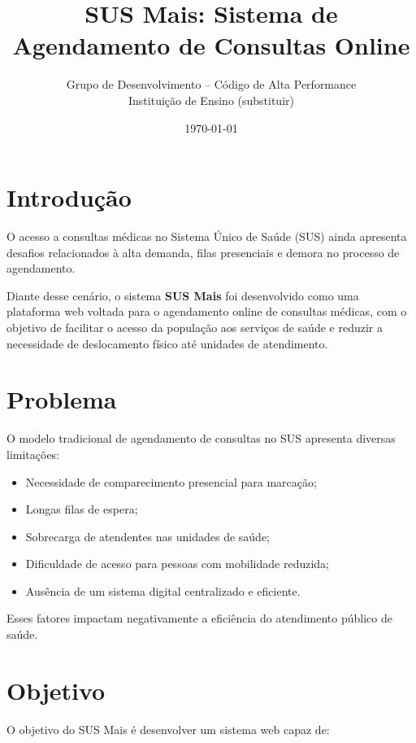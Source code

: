 \documentclass[12pt,a4paper]{article}
\title{\textbf{SUS Mais: Sistema de Agendamento de Consultas Online}}
\author{
Grupo de Desenvolvimento -- Código de Alta Performance \\
Instituição de Ensino (substituir) \\
}
\date{\today}
\begin{document}
\maketitle
\thispagestyle{empty}

\newpage

\tableofcontents
\newpage

\section{Introdução}

O acesso a consultas médicas no Sistema Único de Saúde (SUS) ainda apresenta desafios relacionados à alta demanda, filas presenciais e demora no processo de agendamento.

Diante desse cenário, o sistema \textbf{SUS Mais} foi desenvolvido como uma plataforma web voltada para o agendamento online de consultas médicas, com o objetivo de facilitar o acesso da população aos serviços de saúde e reduzir a necessidade de deslocamento físico até unidades de atendimento.

\section{Problema}

O modelo tradicional de agendamento de consultas no SUS apresenta diversas limitações:

\begin{itemize}
    \item Necessidade de comparecimento presencial para marcação;
    \item Longas filas de espera;
    \item Sobrecarga de atendentes nas unidades de saúde;
    \item Dificuldade de acesso para pessoas com mobilidade reduzida;
    \item Ausência de um sistema digital centralizado e eficiente.
\end{itemize}

Esses fatores impactam negativamente a eficiência do atendimento público de saúde.

\section{Objetivo}

O objetivo do SUS Mais é desenvolver um sistema web capaz de:
\end{document}
